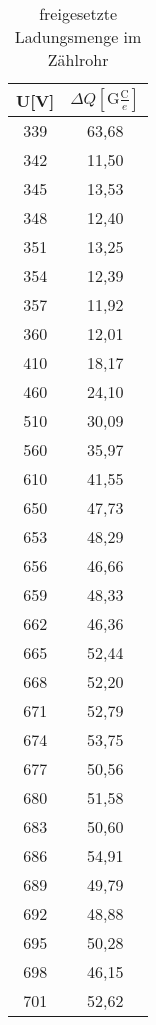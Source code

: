 \begin{table}[h]
	\begin{center}
		\begin{tabular}{cc}
			U[V]&$\Delta Q [\text{G}\frac{\text{C}}{e}]$ \\ \hline
			339&63,68\\
			342&11,50\\
			345&13,53\\
			348&12,40\\
			351&13,25\\
			354&12,39\\
			357&11,92\\
			360&12,01\\
			410&18,17\\
			460&24,10\\
			510&30,09\\
			560&35,97\\
			610&41,55\\
			650&47,73\\
			653&48,29\\
			656&46,66\\
			659&48,33\\
			662&46,36\\
			665&52,44\\
			668&52,20\\
			671&52,79\\
			674&53,75\\
			677&50,56\\
			680&51,58\\
			683&50,60\\
			686&54,91\\
			689&49,79\\
			692&48,88\\
			695&50,28\\
			698&46,15\\
			701&52,62
		\end{tabular}
		\caption{freigesetzte Ladungsmenge im Zählrohr}
		\label{tabd1copy}
	\end{center}
\end{table}